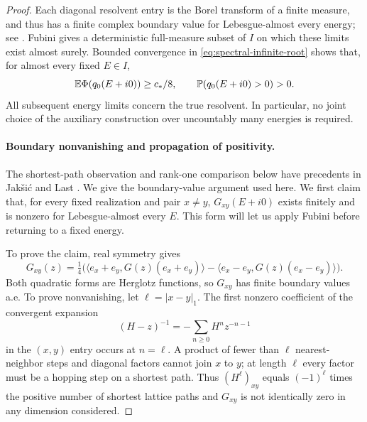 \begin{proof}
Each diagonal resolvent entry is the Borel transform of a finite measure,
and thus has a finite complex boundary value for Lebesgue-almost
every energy; see \cite[Corollary~3.25]{Teschl2009}.
Fubini gives a deterministic full-measure subset of $I$ on which
these limits exist almost surely. Bounded convergence in
\eqref{eq:spectral-infinite-root} shows that, for almost every
fixed $E\in I$,
\begin{equation}\label{eq:spectral-positive-probability}
 \mathbb E\Phi(q_0(E+i0))\ge c_*/8,
 \qquad \mathbb P(q_0(E+i0)>0)>0.
\end{equation}
All subsequent energy limits concern the true resolvent. In
particular, no joint choice of the auxiliary construction over
uncountably many energies is required.

\paragraph{Boundary nonvanishing and propagation of positivity.}
The shortest-path observation and rank-one comparison below have
precedents in Jak\v{s}i\'c and Last
\cite[author-preprint Section~1.1 and proof of Theorem~2.4]{JaksicLast2000}.
We give the boundary-value argument used here. We first claim that,
for every fixed realization and pair $x\ne y$, $G_{xy}(E+i0)$ exists
finitely and is nonzero for Lebesgue-almost every $E$. This form will
let us apply Fubini before returning to a fixed energy.

To prove the claim, real symmetry gives
\[
 G_{xy}(z)=\tfrac14\bigl(
 \langle e_x+e_y,G(z)(e_x+e_y)\rangle
 -\langle e_x-e_y,G(z)(e_x-e_y)\rangle\bigr).
\]
Both quadratic forms are Herglotz functions, so $G_{xy}$ has finite
boundary values a.e. To prove nonvanishing, let $\ell=|x-y|_1$.
The first nonzero coefficient of
the convergent expansion
\[
 (H-z)^{-1}=-\sum_{n\ge0}H^n z^{-n-1}
\]
in the $(x,y)$ entry occurs at $n=\ell$. A product of fewer
than $\ell$ nearest-neighbor steps and diagonal factors cannot
join $x$ to $y$; at length $\ell$ every factor must be a hopping
step on a shortest path. Thus $(H^\ell)_{xy}$ equals
$(-1)^\ell$ times the positive number of shortest lattice paths
and $G_{xy}$ is not identically zero in any dimension considered.


\end{proof}
